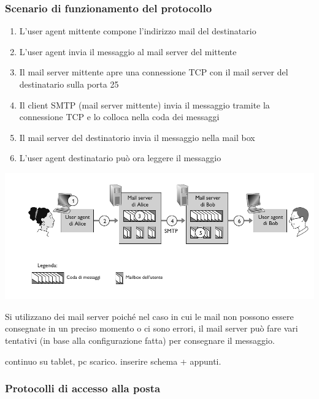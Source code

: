\subsubsection*{Scenario di funzionamento del protocollo}
\begin{enumerate}
  \item L'user agent mittente compone l'indirizzo mail del destinatario
  \item L'user agent invia il messaggio al mail server del mittente
  \item Il mail server mittente apre una connessione TCP con il mail server del destinatario sulla porta 25
  \item Il client SMTP (mail server mittente) invia il messaggio tramite la connessione TCP e lo colloca nella coda dei messaggi
  \item Il mail server del destinatorio invia il messaggio nella mail box
  \item L'user agent destinatario può ora leggere il messaggio
\end{enumerate}

\includegraphics[width=\textwidth]{./img/smtp.png}

Si utilizzano dei mail server poiché nel caso in cui le mail non possono essere consegnate in un preciso momento o ci sono errori, il mail server può fare vari tentativi (in base alla configurazione fatta) per consegnare il messaggio.

continuo su tablet, pc scarico. inserire schema + appunti.

\subsubsection{Protocolli di accesso alla posta}

